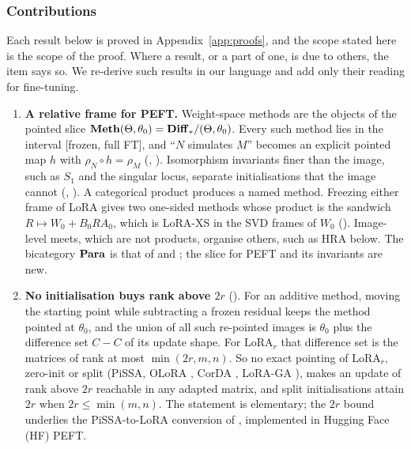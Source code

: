 \subsubsection{Contributions}

Each result below is proved in Appendix~\ref{app:proofs}, and the scope stated here is the scope of the proof. Where a result, or a part of one, is due to others, the item says so. We re-derive such results in our language and add only their reading for fine-tuning.

\begin{enumerate}[label=\textbf{\arabic*.},leftmargin=1.9em]
\item \textbf{A relative frame for PEFT.} Weight-space methods are the objects of the pointed slice $\mathbf{Meth}(\Theta,\theta_0)=\mathbf{Diff}_*/(\Theta,\theta_0)$. Every such method lies in the interval [frozen, full FT], and ``$N$ simulates $M$'' becomes an explicit pointed map $h$ with $\rho_N\circ h=\rho_M$ (, ). Isomorphism invariants finer than the image, such as $S_1$ and the singular locus, separate initialisations that the image cannot (, ). A categorical product produces a named method. Freezing either frame of LoRA gives two one-sided methods whose product is the sandwich $R\mapsto W_0+B_0RA_0$, which is LoRA-XS \citep{baazy2024lora} in the SVD frames of $W_0$ (). Image-level meets, which are not products, organise others, such as HRA below. The bicategory $\mathbf{Para}$ is that of \citet{fong2017backprop} and \citet{cruttwell2021categorical}; the slice for PEFT and its invariants are new.

\item \textbf{No initialisation buys rank above $2r$} (). For an additive method, moving the starting point while subtracting a frozen residual keeps the method pointed at $\theta_0$, and the union of all such re-pointed images is $\theta_0$ plus the difference set $C-C$ of its update shape. For $\mathrm{LoRA}_r$ that difference set is the matrices of rank at most $\min(2r,m,n)$. So no exact pointing of $\mathrm{LoRA}_r$, zero-init or split (PiSSA, OLoRA \citep{buyukakyuz2024olora}, CorDA \citep{yang2024corda}, LoRA-GA \citep{wang2024lorab}), makes an update of rank above $2r$ reachable in any adapted matrix, and split initialisations attain $2r$ when $2r\le\min(m,n)$. The statement is elementary; the $2r$ bound underlies the PiSSA-to-LoRA conversion of \citet{meng2024pissa}, implemented in Hugging Face (HF) PEFT.


\end{enumerate}
